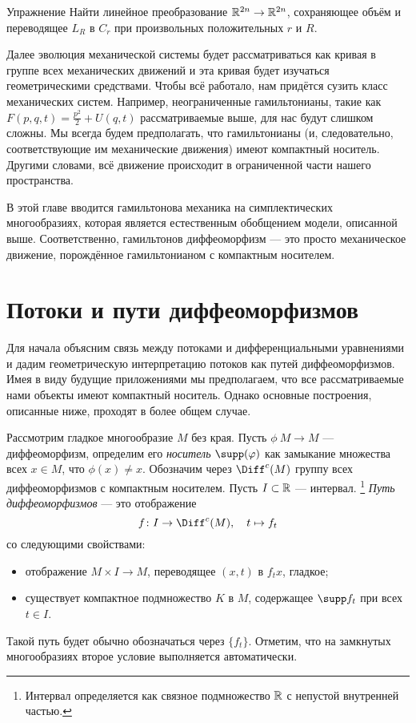 \begin{ex*}{Упражнение}
Найти линейное преобразование $\mathbb{R}^{2n} \to \mathbb{R}^{2n}$, сохраняющее объём и переводящее $L_R$ в $C_r$ при произвольных положительных $r$ и $R$.
\end{ex*}

Далее эволюция механической системы будет рассматриваться как кривая в группе всех механических движений и эта кривая будет изучаться геометрическими средствами.
Чтобы всё работало, нам придётся сузить класс механических систем.
Например, неограниченные гамильтонианы, такие как $F(p,q,t) = \tfrac {p^2}2 + U(q,t)$ рассматриваемые выше, для нас будут слишком сложны.
Мы всегда будем предполагать, что гамильтонианы (и, следовательно, соответствующие им механические движения) имеют компактный носитель.
Другими словами, всё движение происходит в ограниченной части нашего пространства.

В этой главе вводится гамильтонова механика на симплектических многообразиях, которая является естественным обобщением модели, описанной выше.
Соответственно, гамильтонов диффеоморфизм — это просто механическое движение, порождённое гамильтонианом с компактным носителем. 

\section{Потоки и пути диффеоморфизмов}

Для начала объясним связь между потоками и дифференциальными уравнениями и дадим геометрическую интерпретацию потоков как путей диффеоморфизмов.
Имея в виду будущие приложениями мы предполагаем, что все рассматриваемые нами объекты имеют компактный носитель.
Однако основные построения, описанные ниже, проходят в более общем случае.

Рассмотрим гладкое многообразие $M$ без края.
Пусть $\phi\: M \to M$ — диффеоморфизм, определим его \emph{носитель} \index[symb]{$\supp(\phi)$}$\supp(\phi)$ как замыкание множества всех $x \in M$, что $\phi(x) \ne x$.
Обозначим через $\Diff^c (M)$ группу всех диффеоморфизмов с компактным носителем.
Пусть $I \subset \mathbb{R}$ — интервал.%
\footnote{Интервал определяется как связное подмножество $\mathbb{R}$ с непустой внутренней частью.}
\emph{Путь диффеоморфизмов} — это отображение 
\[f\: I \to \Diff^c (M),\quad t \mapsto f_t\]
со следующими свойствами:
\begin{itemize}
\item отображение $M \times I \to M$, переводящее $(x, t)$ в $f_t x$, гладкое;
\item существует компактное подмножество $K$ в $M$, содержащее $\supp f_t$ при всех $t \in I$.
\end{itemize}
Такой путь будет обычно обозначаться через $\{f_t\}$.
Отметим, что на замкнутых многообразиях второе условие выполняется автоматически.

